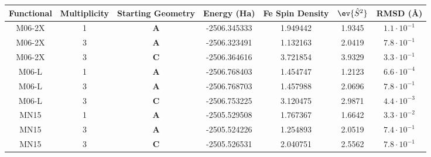 \begin{tabular}{ccccccc}
\toprule
Functional & Multiplicity & Starting Geometry &  Energy (Ha) &  Fe Spin Density &  $\ev{\hat{S}^2}$ &            RMSD (Å) \\
\midrule
    M06-2X &            1 &        \textbf{A} & -2506.345333 &         1.949442 &            1.9345 & $1.1 \cdot 10^{-1}$ \\
    M06-2X &            3 &        \textbf{A} & -2506.323491 &         1.132163 &            2.0419 & $7.8 \cdot 10^{-1}$ \\
    M06-2X &            3 &        \textbf{C} & -2506.364616 &         3.721854 &            3.9329 & $3.3 \cdot 10^{-1}$ \\
     M06-L &            1 &        \textbf{A} & -2506.768403 &         1.454747 &            1.2123 & $6.6 \cdot 10^{-4}$ \\
     M06-L &            3 &        \textbf{A} & -2506.768703 &         1.457988 &            2.0696 & $7.8 \cdot 10^{-1}$ \\
     M06-L &            3 &        \textbf{C} & -2506.753225 &         3.120475 &            2.9871 & $4.4 \cdot 10^{-3}$ \\
      MN15 &            1 &        \textbf{A} & -2505.529508 &         1.767367 &            1.6642 & $3.3 \cdot 10^{-2}$ \\
      MN15 &            3 &        \textbf{A} & -2505.524226 &         1.254893 &            2.0519 & $7.4 \cdot 10^{-1}$ \\
      MN15 &            3 &        \textbf{C} & -2505.526531 &         2.040751 &            2.5562 & $7.8 \cdot 10^{-1}$ \\
\bottomrule
\end{tabular}
